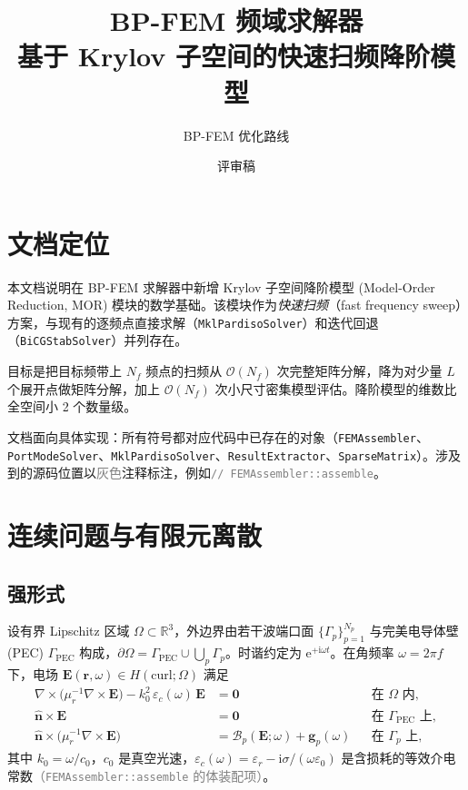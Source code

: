 \documentclass[11pt,a4paper]{ctexart}
\title{BP-FEM 频域求解器 \\ 基于 Krylov 子空间的快速扫频降阶模型}
\author{BP-FEM 优化路线}
\date{评审稿}
\newcommand{\R}{\mathbb{R}}
\newcommand{\im}{\mathrm{i}}
\begin{document}
\maketitle
\tableofcontents
\bigskip

\section{文档定位}

本文档说明在 BP-FEM 求解器中新增 Krylov 子空间降阶模型 (Model-Order Reduction, MOR) 模块的数学基础。该模块作为\emph{快速扫频}（fast frequency sweep）方案，与现有的逐频点直接求解（\texttt{MklPardisoSolver}）和迭代回退（\texttt{BiCGStabSolver}）并列存在。

目标是把目标频带上 $N_f$ 频点的扫频从 $\mathcal{O}(N_f)$ 次完整矩阵分解，降为对少量 $L$ 个展开点做矩阵分解，加上 $\mathcal{O}(N_f)$ 次小尺寸密集模型评估。降阶模型的维数比全空间小 2 个数量级。

文档面向具体实现：所有符号都对应代码中已存在的对象（\texttt{FEMAssembler}、\texttt{PortModeSolver}、\texttt{MklPardisoSolver}、\texttt{ResultExtractor}、\texttt{SparseMatrix}）。涉及到的源码位置以\textcolor{gray}{灰色}注释标注，例如\textcolor{gray}{\texttt{// FEMAssembler::assemble}}。

\section{连续问题与有限元离散}

\subsection{强形式}

设有界 Lipschitz 区域 $\Omega \subset \R^3$，外边界由若干波端口面 $\{\Gamma_p\}_{p=1}^{N_p}$ 与完美电导体壁 (PEC) $\Gamma_{\mathrm{PEC}}$ 构成，$\partial\Omega = \Gamma_{\mathrm{PEC}}\cup \bigcup_p \Gamma_p$。时谐约定为 $\mathrm{e}^{+\im\omega t}$。在角频率 $\omega = 2\pi f$ 下，电场 $\bm E(\bm r,\omega) \in H(\mathrm{curl};\Omega)$ 满足
\begin{align}
  \nabla\times\!\big(\mu_r^{-1}\nabla\times\bm E\big)
  -k_0^2\,\varepsilon_c(\omega)\,\bm E
  &= \bm 0
  & &\text{在 } \Omega \text{ 内},\label{eq:strong}\\
  \hat{\bm n}\times\bm E &= \bm 0
  & &\text{在 } \Gamma_{\mathrm{PEC}} \text{ 上},\\
  \hat{\bm n}\times\!\big(\mu_r^{-1}\nabla\times\bm E\big)
  &= \mathcal B_p(\bm E;\omega) + \bm g_p(\omega)
  & &\text{在 } \Gamma_p \text{ 上},
\end{align}
其中 $k_0 = \omega/c_0$，$c_0$ 是真空光速，$\varepsilon_c(\omega) = \varepsilon_r - \im\sigma/(\omega\varepsilon_0)$ 是含损耗的等效介电常数\textcolor{gray}{（\texttt{FEMAssembler::assemble} 的体装配项）}。
\end{document}
